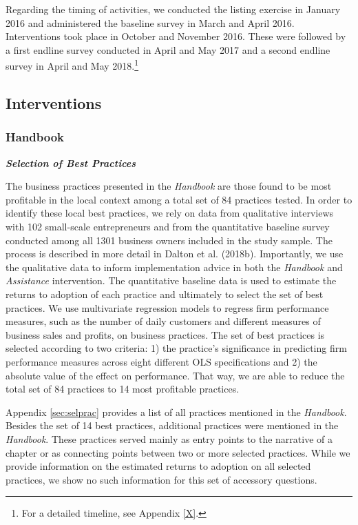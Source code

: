 \documentclass[11.5pt]{article}
\begin{document}
Regarding the timing of activities, we conducted the listing exercise in January 2016 and administered the baseline survey in March and April 2016. Interventions took place in October and November 2016. These were followed by a first endline survey conducted in April and May 2017 and a second endline survey in April and May 2018.\footnote{For a detailed timeline, see Appendix \ref{X}.}

\subsection{Interventions}

\subsubsection{Handbook}

\emph{\textbf{Selection of Best Practices}}\

The business practices presented in the \emph{Handbook} are those found to be most profitable in the local context among a total set of 84 practices tested. In order to identify these local best practices, we rely on data from qualitative interviews with 102 small-scale entrepreneurs and from the quantitative baseline survey conducted among all 1301 business owners included in the study sample. The process is described in more detail in Dalton et al. (2018b). Importantly, we use the qualitative data to inform implementation advice in both the \emph{Handbook} and \emph{Assistance} intervention. The quantitative baseline data is used to estimate the returns to adoption of each practice and ultimately to select the set of best practices. We use multivariate regression models to regress firm performance measures, such as the number of daily customers and different measures of business sales and profits, on business practices. The set of best practices is selected according to two criteria: 1) the practice's significance in predicting firm performance measures across eight different OLS specifications and 2) the absolute value of the effect on performance. That way, we are able to reduce the total set of 84 practices to 14 most profitable practices. %

Appendix \ref{sec:selprac} provides a list of all practices mentioned in the \emph{Handbook}. Besides the set of 14 best practices, additional practices were mentioned in the \emph{Handbook}. These practices served mainly as entry points to the narrative of a chapter or as connecting points between two or more selected practices. While we provide information on the estimated returns to adoption on all selected practices, we show no such information for this set of accessory questions. \\
\end{document}
